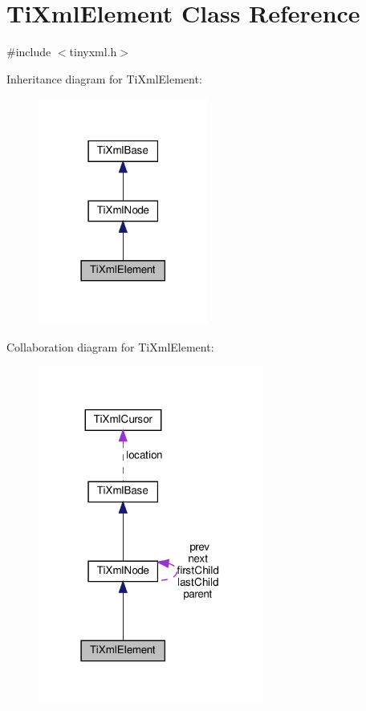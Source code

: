 \hypertarget{classTiXmlElement}{}\section{Ti\+Xml\+Element Class Reference}
\label{classTiXmlElement}


{\ttfamily \#include $<$tinyxml.\+h$>$}



Inheritance diagram for Ti\+Xml\+Element\+:
\nopagebreak
\begin{figure}[H]
\begin{center}
\leavevmode
\includegraphics[width=158pt]{classTiXmlElement__inherit__graph}
\end{center}
\end{figure}


Collaboration diagram for Ti\+Xml\+Element\+:
\nopagebreak
\begin{figure}[H]
\begin{center}
\leavevmode
\includegraphics[width=210pt]{classTiXmlElement__coll__graph}
\end{center}
\end{figure}

